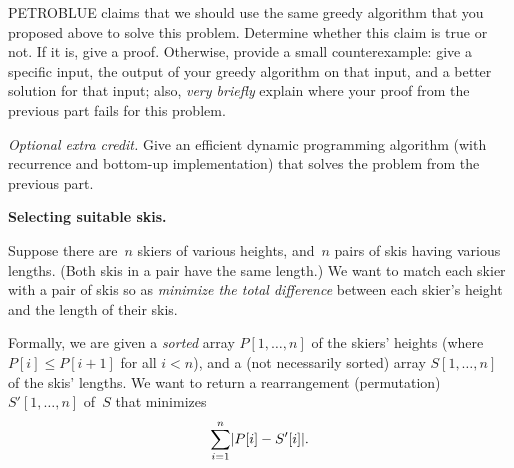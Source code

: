 \documentclass[11pt,addpoints]{exam}
\begin{document}
\begin{questions}
\begin{parts}
    PETROBLUE claims that we should use the same greedy algorithm that you proposed above to solve this problem.
    Determine whether this claim is true or not.
    If it is, give a proof.
    Otherwise, provide a small counterexample: give a specific input, the output of your greedy algorithm on that input, and a better solution for that input; also, \emph{very briefly} explain where your proof from the previous part fails for this problem.

    \begin{solution}

    \end{solution}
    
    \bonuspart[3] \emph{Optional extra credit.}
    Give an efficient dynamic programming algorithm (with recurrence and bottom-up implementation) that solves the problem from the previous part.
    
    \begin{solution}
    \end{solution}
  \end{parts}

  \question \textbf{Selecting suitable skis.}

  Suppose there are~$n$ skiers of various heights, and~$n$ pairs of skis having various lengths.
  (Both skis in a pair have the same length.)
  We want to match each skier with a pair of skis so as \emph{minimize the total difference} between each skier's height and the length of their skis.

  Formally, we are given a \emph{sorted} array $P[1,\ldots,n]$ of the skiers' heights (where $P[i] \leq P[i+1]$ for all $i<n$), and a (not necessarily sorted) array $S[1,\ldots,n]$ of the skis' lengths.
  We want to return a rearrangement (permutation) $S'[1,\ldots,n]$ of~$S$ that minimizes \[ \sum_{i=1}^n \abs*{ P[i] - S'[i] } \text. \]

\end{questions}
\end{document}
